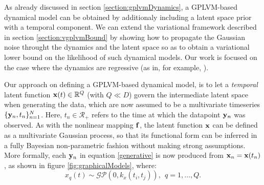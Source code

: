 \documentclass [10pt , a4paper]{article}
\begin{document}
As already discussed in section \ref{section:gplvmDynamics}, a GPLVM-based dynamical model can be obtained by
additionaly including a latent space prior with a temporal component. We can extend the variational framework
described in section \ref{section:vgplvmBound} by showing how to propagate the Gaussian noise throught
the dynamics and the latent space so as to obtain a variational lower bound on the likelihood of such dynamical models.
Our work is focused on the case where the dynamics are regressive (as in, for example, \cite{hgplvm}).
\par Our approach on defining a GPLVM-based dynamical model, is to let
 a {\em temporal} latent function $\mathbf{x}(t) \in
 \mathbb{R}^Q$ (with $Q \ll D$) govern the intermediate latent space when generating the data, which are
 now assumed to be a multivariate timeseries $\{\mathbf{y}_n,t_n\}_{n=1}^N$. Here, $t_n \in \mathcal{R}_+$ refers to the time at which the datapoint $\mathbf{y}_n$ was
 observed. As with the nonlinear mapping $\mathbf{f}$, the latent function $\mathbf{x}$ can be defined as a multivariate Gaussian process,
 so that its functional form can be inferred in a fully Bayesian non-parametric fashion without making strong assumptions.
 More formally, each $\mathbf{y}_n$ in equation \eqref{generative} is now produced from $\mathbf{x}_n = \mathbf{x}(t_n)$, as shown in figure
 \ref{fig:graphicalModels}, where:
\begin{equation}
  \label{xt}
  x_q(t)  \sim \mathcal{GP}(0, k_x(t_i,t_j)), \ \ q=1,\ldots,Q .    
\end{equation}

\end{document}

